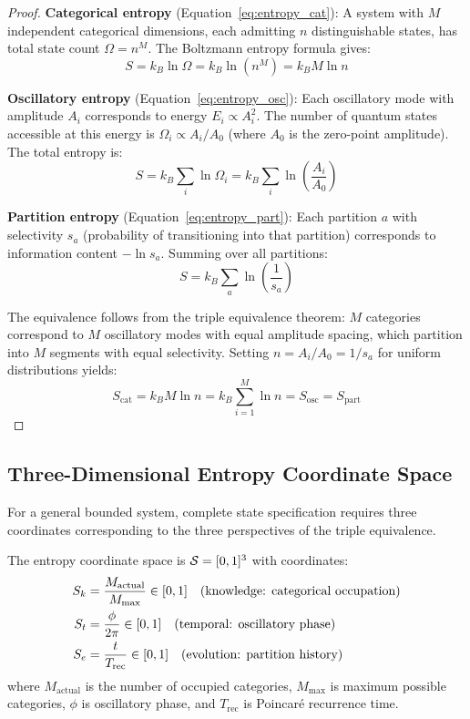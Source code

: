 \begin{proof}
\textbf{Categorical entropy} (Equation~\ref{eq:entropy_cat}): A system with $M$ independent categorical dimensions, each admitting $n$ distinguishable states, has total state count $\Omega = n^M$. The Boltzmann entropy formula gives:
\begin{equation}
S = k_B \ln \Omega = k_B \ln(n^M) = k_B M \ln n
\end{equation}

\textbf{Oscillatory entropy} (Equation~\ref{eq:entropy_osc}): Each oscillatory mode with amplitude $A_i$ corresponds to energy $E_i \propto A_i^2$. The number of quantum states accessible at this energy is $\Omega_i \propto A_i/A_0$ (where $A_0$ is the zero-point amplitude). The total entropy is:
\begin{equation}
S = k_B \sum_i \ln \Omega_i = k_B \sum_i \ln\left(\frac{A_i}{A_0}\right)
\end{equation}

\textbf{Partition entropy} (Equation~\ref{eq:entropy_part}): Each partition $a$ with selectivity $s_a$ (probability of transitioning into that partition) corresponds to information content $-\ln s_a$. Summing over all partitions:
\begin{equation}
S = k_B \sum_a \ln\left(\frac{1}{s_a}\right)
\end{equation}

The equivalence follows from the triple equivalence theorem: $M$ categories correspond to $M$ oscillatory modes with equal amplitude spacing, which partition into $M$ segments with equal selectivity. Setting $n = A_i/A_0 = 1/s_a$ for uniform distributions yields:
\begin{equation}
S_{\text{cat}} = k_B M \ln n = k_B \sum_{i=1}^{M} \ln n = S_{\text{osc}} = S_{\text{part}}
\end{equation}
\end{proof}

\subsection{Three-Dimensional Entropy Coordinate Space}

For a general bounded system, complete state specification requires three coordinates corresponding to the three perspectives of the triple equivalence.

\begin{definition}
\label{def:entropy_space}
The entropy coordinate space is $\mathcal{S} = [0,1]^3$ with coordinates:
\begin{align}
S_k &= \frac{M_{\text{actual}}}{M_{\text{max}}} \in [0,1] \quad \text{(knowledge: categorical occupation)} \\
S_t &= \frac{\phi}{2\pi} \in [0,1] \quad \text{(temporal: oscillatory phase)} \\
S_e &= \frac{t}{T_{\text{rec}}} \in [0,1] \quad \text{(evolution: partition history)}
\end{align}
where $M_{\text{actual}}$ is the number of occupied categories, $M_{\text{max}}$ is maximum possible categories, $\phi$ is oscillatory phase, and $T_{\text{rec}}$ is Poincaré recurrence time.
\end{definition}

